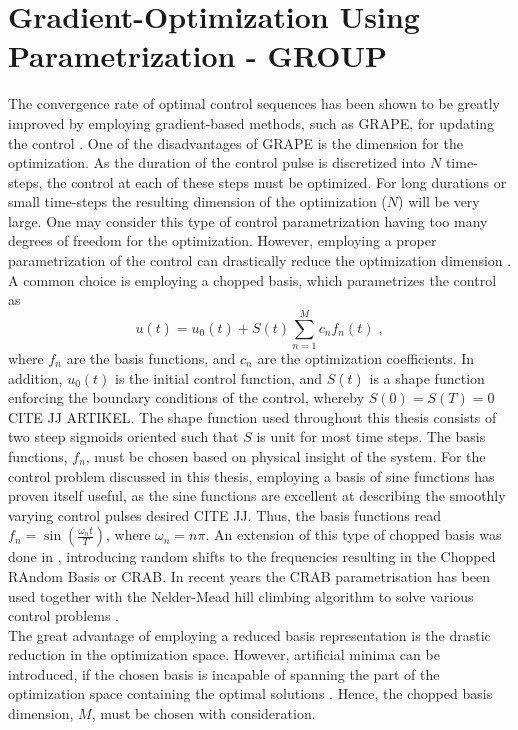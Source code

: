 \section{Gradient-Optimization Using Parametrization - GROUP} \label{sec:GROUP}
The convergence rate of optimal control sequences has been shown to be greatly improved by employing gradient-based methods, such as GRAPE, for updating the control \cite{Jager2014}.
One of the disadvantages of GRAPE is the dimension for the optimization. As the duration of the control pulse is discretized into $N$ time-steps, the control at each of these steps must be optimized. For long durations or small time-steps the resulting dimension of the optimization ($N$) will be very large. One may consider this type of control parametrization having too many degrees of freedom for the optimization. 
However, employing a proper parametrization of the control can drastically reduce the optimization dimension \cite{Winckel2008}.\\
A common choice is employing a chopped basis, which parametrizes the control as
\begin{equation}
	u(t) = u_0 (t) + S(t) \sum_{n=1}^{M} c_n f_n (t) \; , \label{eq:controlParametrization}
\end{equation}   
where $f_n$ are the basis functions, and $c_n$ are the optimization coefficients. In addition, $u_0 (t)$ is the initial control function, and $S (t)$ is a shape function enforcing the boundary conditions of the control, whereby $S(0) = S(T) = 0$ CITE JJ ARTIKEL. The shape function used throughout this thesis consists of two steep sigmoids oriented such that $S$ is unit for most time steps. The basis functions, $f_n$, must be chosen based on physical insight of the system. For the control problem discussed in this thesis, employing a basis of sine functions has proven itself useful, as the sine functions are excellent at describing the smoothly varying control pulses desired CITE JJ. Thus, the basis functions read $f_n = \sin \left( \frac{\omega_n t}{T} \right)$, where $\omega_n = n \pi$.
An extension of this type of chopped basis was done in \cite{Doria2011,Caneva2011crab}, introducing random shifts to the frequencies resulting in the Chopped RAndom Basis or \textsc{CRAB}. In recent years the \textsc{CRAB} parametrisation has been used together with the Nelder-Mead hill climbing algorithm to solve various control problems \cite{Doria2011,Caneva2011,FrankBloch,Lloyd2014}.\\
The great advantage of employing a reduced basis representation is the drastic reduction in the optimization space. However, artificial minima can be introduced, if the chosen basis is incapable of spanning the part of the optimization space containing the optimal solutions \cite{Rach2015}. Hence, the chopped basis dimension, $M$, must be chosen with consideration.\\


